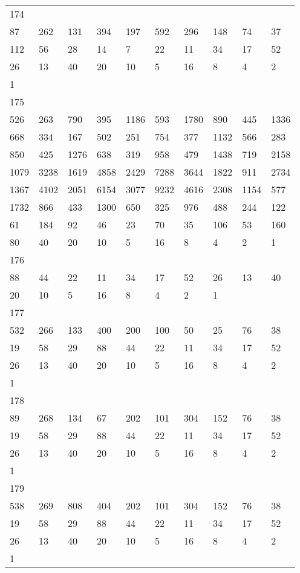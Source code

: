\begin{longtable}{*{10}{l}}
174&&&&&&&&&\\
87& 262& 131& 394& 197& 592& 296& 148& 74& 37\\
112& 56& 28& 14& 7& 22& 11& 34& 17& 52\\
26& 13& 40& 20& 10& 5& 16& 8& 4& 2\\
1& \\

175&&&&&&&&&\\
526& 263& 790& 395& 1186& 593& 1780& 890& 445& 1336\\
668& 334& 167& 502& 251& 754& 377& 1132& 566& 283\\
850& 425& 1276& 638& 319& 958& 479& 1438& 719& 2158\\
1079& 3238& 1619& 4858& 2429& 7288& 3644& 1822& 911& 2734\\
1367& 4102& 2051& 6154& 3077& 9232& 4616& 2308& 1154& 577\\
1732& 866& 433& 1300& 650& 325& 976& 488& 244& 122\\
61& 184& 92& 46& 23& 70& 35& 106& 53& 160\\
80& 40& 20& 10& 5& 16& 8& 4& 2& 1\\

176&&&&&&&&&\\
88& 44& 22& 11& 34& 17& 52& 26& 13& 40\\
20& 10& 5& 16& 8& 4& 2& 1& \\

177&&&&&&&&&\\
532& 266& 133& 400& 200& 100& 50& 25& 76& 38\\
19& 58& 29& 88& 44& 22& 11& 34& 17& 52\\
26& 13& 40& 20& 10& 5& 16& 8& 4& 2\\
1& \\

178&&&&&&&&&\\
89& 268& 134& 67& 202& 101& 304& 152& 76& 38\\
19& 58& 29& 88& 44& 22& 11& 34& 17& 52\\
26& 13& 40& 20& 10& 5& 16& 8& 4& 2\\
1& \\

179&&&&&&&&&\\
538& 269& 808& 404& 202& 101& 304& 152& 76& 38\\
19& 58& 29& 88& 44& 22& 11& 34& 17& 52\\
26& 13& 40& 20& 10& 5& 16& 8& 4& 2\\
1& \\


\end{longtable}
